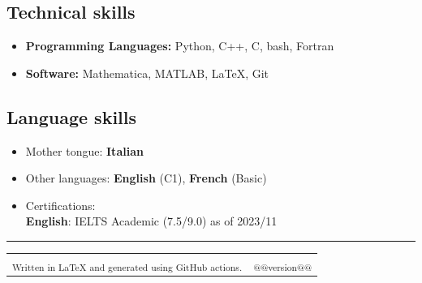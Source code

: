 \documentclass[10pt,a4paper]{article}
\makeatletter
\newcommand{\headerrow}[2]
{\begin{tabular*}{\linewidth}{l@{\extracolsep{\fill}}r}
	#1 &
	#2 \\
\end{tabular*}}
\makeatother
\begin{document}
\subsection*{Technical skills}
\begin{itemize}[leftmargin=1em]
  \item[] \textbf{Programming Languages:} Python, C++, C, bash, Fortran
  \item[] \textbf{Software:} Mathematica, MATLAB, \LaTeX, Git
\end{itemize}

\subsection*{Language skills}
\begin{itemize}[leftmargin=1em]
  \item[] Mother tongue: \textbf{Italian}
  \item[] Other languages: \textbf{English} (C1), \textbf{French} (Basic)
  \item[] Certifications:\\ 
  \textbf{English}: IELTS Academic (7.5/9.0) as of 2023/11
\end{itemize}

\vfill
\hrule
\begin{description}
  \item
\headerrow
  {{\textsubscript{Written in {\LaTeX} and generated using GitHub actions.}}}
  {{\textsubscript{@@version@@}}}
\end{description}
\end{document}
